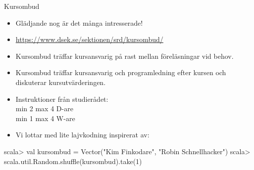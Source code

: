 
\begin{SlideExtra}{Kursombud}
\begin{itemize}
\item Glädjande nog är det många intresserade!
\item \url{https://www.dsek.se/sektionen/srd/kursombud/}
\item Kursombud träffar kursansvarig på rast mellan föreläsningar vid behov.
\item Kursombud träffar kursansvarig och programledning efter kursen och diskuterar kursutvärderingen.
\item Instruktioner från studierådet: \\ min 2 max 4 D-are \\ min 1 max 4 W-are
\item Vi lottar med lite lajvkodning inspirerat av:
\end{itemize}
\begin{REPL}
scala> val kursombud = Vector("Kim Finkodare", "Robin Schnellhacker")
scala> scala.util.Random.shuffle(kursombud).take(1)
\end{REPL}
\end{SlideExtra}
